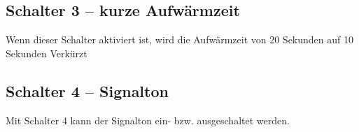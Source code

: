 \documentclass[12pt,a4paper,final]{article}
\begin{document}
\subsection{Schalter 3 -- kurze Aufwärmzeit}
Wenn dieser Schalter aktiviert ist, wird die Aufwärmzeit von 20 Sekunden auf 10 Sekunden Verkürzt
\subsection{Schalter 4 -- Signalton}
Mit Schalter 4 kann der Signalton ein- bzw. ausgeschaltet werden.
\end{document}
